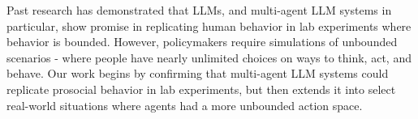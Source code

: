 

Past research has demonstrated that LLMs, and multi-agent LLM systems in particular, show promise in replicating human behavior in lab experiments where behavior is bounded. However, policymakers require simulations of unbounded scenarios - where people have nearly unlimited choices on ways to think, act, and behave. Our work begins by confirming that multi-agent LLM systems could replicate prosocial behavior in lab experiments, but then extends it into select real-world situations where agents had a more unbounded action space.\color{black}




